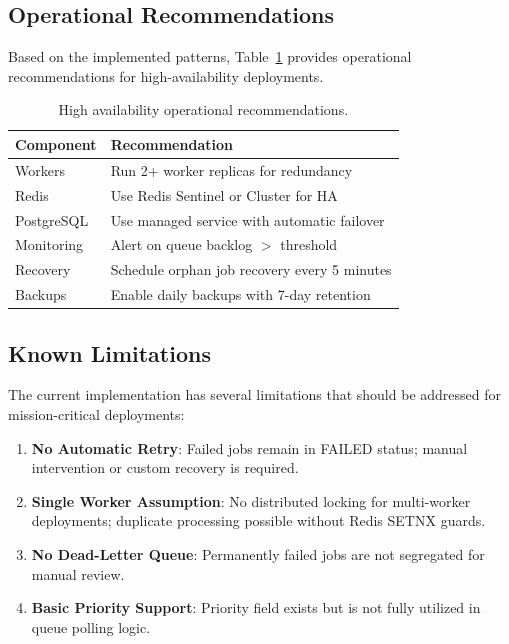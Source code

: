 \subsection{Operational Recommendations}

Based on the implemented patterns, Table~\ref{tab:ha-recommendations} provides operational recommendations for high-availability deployments.

\begin{table}[ht]
\centering
\caption{High availability operational recommendations.}
\label{tab:ha-recommendations}
\small
\begin{tabular}{lp{7cm}}
\hline
\textbf{Component} & \textbf{Recommendation} \\
\hline
Workers & Run 2+ worker replicas for redundancy \\
Redis & Use Redis Sentinel or Cluster for HA \\
PostgreSQL & Use managed service with automatic failover \\
Monitoring & Alert on queue backlog $>$ threshold \\
Recovery & Schedule orphan job recovery every 5 minutes \\
Backups & Enable daily backups with 7-day retention \\
\hline
\end{tabular}
\end{table}

\subsection{Known Limitations}

The current implementation has several limitations that should be addressed for mission-critical deployments:

\begin{enumerate}
    \item \textbf{No Automatic Retry}: Failed jobs remain in FAILED status; manual intervention or custom recovery is required.
    
    \item \textbf{Single Worker Assumption}: No distributed locking for multi-worker deployments; duplicate processing possible without Redis SETNX guards.
    
    \item \textbf{No Dead-Letter Queue}: Permanently failed jobs are not segregated for manual review.
    
    \item \textbf{Basic Priority Support}: Priority field exists but is not fully utilized in queue polling logic.
\end{enumerate}

